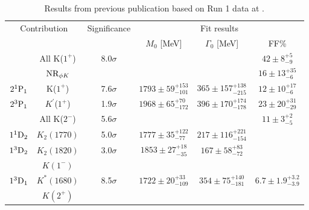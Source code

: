 \begin{table}[h]
\centering
\caption{Results from previous publication based on Run 1 data at \lhcb\supercite{LHCb-PAPER-2016-018}.}\label{tab:run1}

\begin{tabular}{cccccc}
\hline
\multicolumn{2}{c}{Contribution} &Significance & \multicolumn{3}{c}{Fit results} \\
                &                                  &            & $M_0$ [MeV]   & $\Gamma_0$ [MeV]      & FF\% \\
\hline \hline
&      All K($1^+$)   & 8.0$\sigma$       &      &      &  $42\pm 8^{+5}_{-9}$  \\
   &      ${\rm NR}_{\phi K}$  &       &      &      &  $16\pm 13^{+35}_{-6}$  \\
$2{}^{1}{\rm P}_{1}$   &    K($1^+$)   & 7.6$\sigma$       &  $1793\pm 59^{+153}_{-101} $   &   $365\pm 157^{+138}_{-215} $   &  $12\pm 10^{+17}_{-6}$ \\
$2{}^{3}{\rm P}_{1}$     &    $K^{\prime}$($1^+$)   & 1.9$\sigma$       &  $1968\pm 65^{+70}_{-172} $   &   $396\pm 170^{+174}_{-178} $   &  $23\pm 20^{+31}_{-29}$   \\
\hline
   &       All K($2^-$)   & 5.6$\sigma$       &      &      &  $11\pm 3^{+2}_{-5}$  \\
$1{}^{1}{\rm D}_{2}$   &  $K_2 (1770)$     & 5.0$\sigma$       &  $1777\pm 35^{+122}_{-77} $   &   $217\pm 116^{+221}_{-154} $   & \\
$1{}^{3}{\rm D}_{2}$ &  $K_2(1820)$   & 3.0$\sigma$       &  $1853\pm 27^{+18}_{-35} $   &   $167\pm 58^{+83}_{-72} $   &   \\       
\hline    
& $K(1^-)$ \\
$1{}^{3}{\rm D}_{1}$  &  $K^*(1680)$  &    8.5$\sigma$       &  $1722\pm 20^{+33}_{-109} $   &   $354\pm 75^{+140}_{-181} $   & $6.7 \pm 1.9^{+3.2}_{-3.9}$ \\  
\hline 
& $K(2^+)$\\


\end{tabular}
\end{table}

